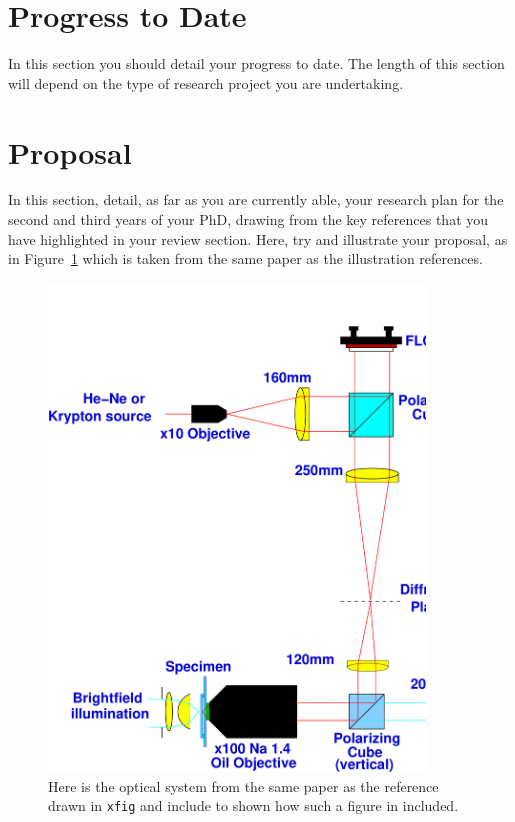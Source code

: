 \documentclass[a4paper,12pt]{article}
\begin{document}
\section{Progress to Date}

In this section you should detail your progress to date. The length of this section
will depend on the type of research project you are undertaking.  

\section{Proposal}

In this section, detail, as far as you are currently able, 
your research plan for the second and third years of your PhD, 
drawing from the key references \cite{jr:block} that you have highlighted in your review section. 
Here, try and illustrate
your proposal, as in Figure~\ref{fig:prism} which is taken from the
same paper as the illustration references.
%
%
\begin{figure}[htb]     %
        \begin{center}
          \includegraphics[width=100mm]{OpticalSystem}
\end{center}
\caption{Here is the optical system from the same paper
  as the reference drawn in {\tt xfig} and include to
  shown how such a figure in included.}
\label{fig:prism}                 %
\end{figure}
\end{document}
